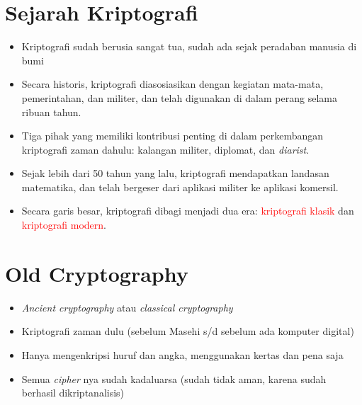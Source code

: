 \documentclass{article}
\begin{document}
\newpage


\section*{Sejarah Kriptografi}

\begin{itemize}
    \item Kriptografi sudah berusia sangat tua, sudah ada sejak peradaban manusia di bumi
    \item Secara historis, kriptografi diasosiasikan dengan kegiatan mata-mata, pemerintahan, dan militer, dan telah digunakan di dalam perang selama ribuan tahun.
    \item Tiga pihak yang memiliki kontribusi penting di dalam perkembangan kriptografi zaman dahulu: kalangan militer, diplomat, dan \textit{diarist}.
    \item Sejak lebih dari 50 tahun yang lalu, kriptografi mendapatkan landasan matematika, dan telah bergeser dari aplikasi militer ke aplikasi komersil.
    \item Secara garis besar, kriptografi dibagi menjadi dua era: \textcolor{red}{kriptografi klasik} dan \textcolor{red}{kriptografi modern}.
\end{itemize}

\newpage


\vspace{238.79mm}

\section*{Old Cryptography}

\begin{itemize}
    \item \textit{Ancient cryptography} atau \textit{classical cryptography}
    \item Kriptografi zaman dulu (sebelum Masehi s/d sebelum ada komputer digital)
    \item Hanya mengenkripsi huruf dan angka, menggunakan kertas dan pena saja
    \item Semua \textit{cipher} nya sudah kadaluarsa (sudah tidak aman, karena sudah berhasil dikriptanalisis)
\end{itemize}

\vspace{10mm}
\end{document}
